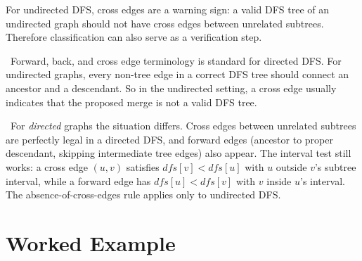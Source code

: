 For undirected DFS, cross edges are a warning sign: a valid DFS tree of an undirected graph should not have cross edges between unrelated subtrees.
Therefore classification can also serve as a verification step.

\begin{pppitfall}
\ Forward, back, and cross edge terminology is standard for directed DFS.
For undirected graphs, every non-tree edge in a correct DFS tree should connect an ancestor and a descendant.
So in the undirected setting, a cross edge usually indicates that the proposed merge is not a valid DFS tree.
\end{pppitfall}

\begin{ppnote}
\ For \emph{directed} graphs the situation differs.
Cross edges between unrelated subtrees are perfectly legal in a directed DFS, and forward edges (ancestor to proper descendant, skipping intermediate tree edges) also appear.
The interval test still works: a cross edge \((u,v)\) satisfies \(dfs[v] < dfs[u]\) with \(u\) outside \(v\)'s subtree interval, while a forward edge has \(dfs[u] < dfs[v]\) with \(v\) inside \(u\)'s interval.
The absence-of-cross-edges rule applies only to undirected DFS.
\end{ppnote}

\section{Worked Example}
\label{sec:lec26-worked-example}

